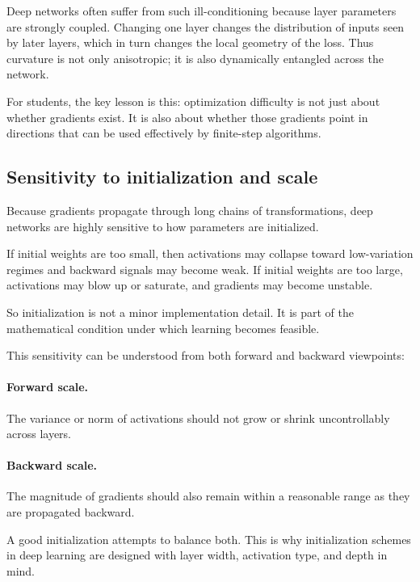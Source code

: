 Deep networks often suffer from such ill-conditioning because layer parameters are strongly coupled.
Changing one layer changes the distribution of inputs seen by later layers, which in turn changes the local geometry of the loss.
Thus curvature is not only anisotropic; it is also dynamically entangled across the network.

\medskip

For students, the key lesson is this:
optimization difficulty is not just about whether gradients exist.
It is also about whether those gradients point in directions that can be used effectively by finite-step algorithms.

\subsection*{Sensitivity to initialization and scale}

Because gradients propagate through long chains of transformations, deep networks are highly sensitive to how parameters are initialized.

\medskip

If initial weights are too small, then activations may collapse toward low-variation regimes and backward signals may become weak.
If initial weights are too large, activations may blow up or saturate, and gradients may become unstable.

\medskip

So initialization is not a minor implementation detail.
It is part of the mathematical condition under which learning becomes feasible.

\medskip

This sensitivity can be understood from both forward and backward viewpoints:

\paragraph{Forward scale.}
The variance or norm of activations should not grow or shrink uncontrollably across layers.

\paragraph{Backward scale.}
The magnitude of gradients should also remain within a reasonable range as they are propagated backward.

\medskip

A good initialization attempts to balance both.
This is why initialization schemes in deep learning are designed with layer width, activation type, and depth in mind.

